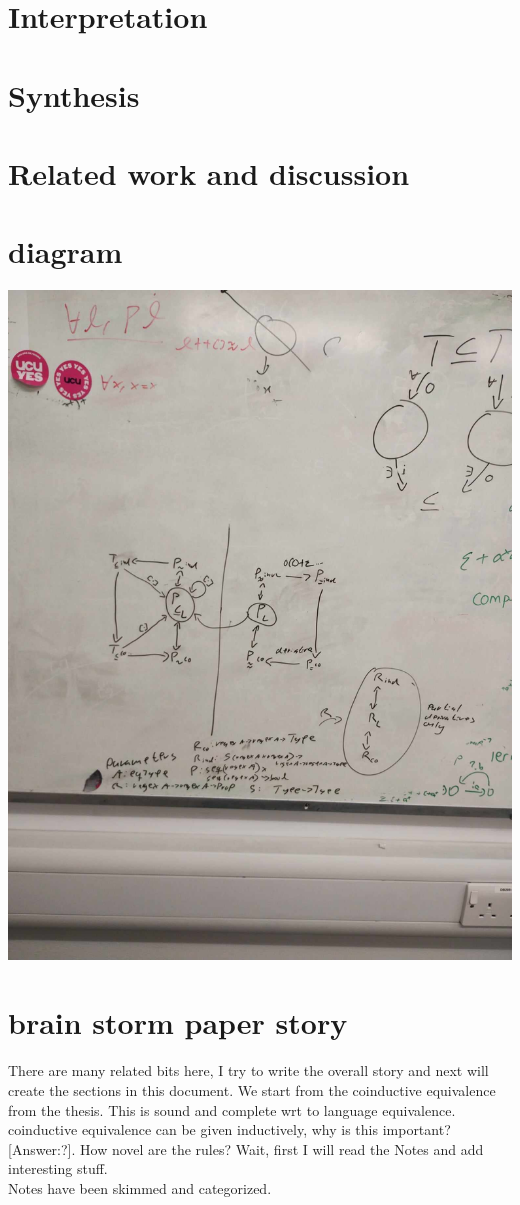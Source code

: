 \documentclass[a4paper,UKenglish,cleveref, autoref, thm-restate]{lipics-v2021}
\begin{document}
\section{Interpretation}
\section{Synthesis}
\section{Related work and discussion}
\section{diagram}
\includegraphics[width=\linewidth]{imgs/diagram.jpg}

\section{brain storm paper story}
There are many related bits here, I try to write the overall story and next will create the sections in this document.
We start from the coinductive equivalence from the thesis. This is sound and complete wrt to language equivalence. coinductive equivalence can be given inductively, why is this important? [Answer:?]. How novel are the rules?
Wait, first I will read the Notes and add interesting stuff.\\
Notes have been skimmed and categorized.\\
\end{document}
